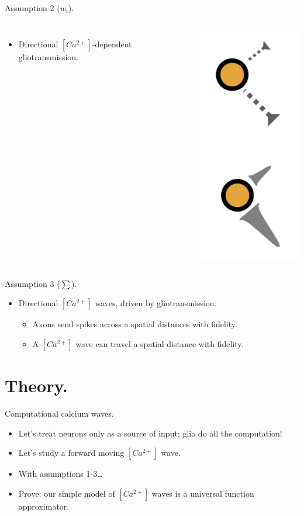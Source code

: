 \documentclass[10pt]{beamer}
\begin{document}
\begin{frame}[fragile]{Assumption 2 ($w_i$).}
\begin{columns}
\begin{itemize}
    \item \alert{Directional} $[Ca^{2+}]$-dependent gliotransmission.
\end{itemize}
    \centering
    \includegraphics[scale=0.4]{images/gliotrans.jpeg}
\end{columns}
\end{frame}

\begin{frame}[fragile]{Assumption 3 ($\sum$).}
\begin{itemize}
    \item \alert{Directional} $[Ca^{2+}]$ waves, driven by gliotransmission.
    \begin{itemize}
    \item Axons send spikes across a spatial distances with fidelity.
    \item A $[Ca^{2+}]$ wave can travel a spatial distance with fidelity.
    \end{itemize}
\end{itemize}
\end{frame}

\section[In theory.]{Theory.}
\begin{frame}[fragile]{Computational calcium waves.}
\begin{itemize}
\item Let's treat neurons only as a source of input; glia do all the computation!
\item Let's study a forward moving $[Ca^{2+}]$ wave.
\item With assumptions 1-3\ldots
\item \alert{Prove}: our simple model of $[Ca^{2+}]$ waves is a universal function approximator.
\end{itemize}
\end{frame}
\end{document}
